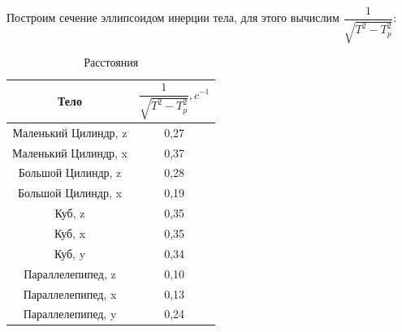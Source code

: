 Построим сечение эллипсоидом инерции тела, для этого вычислим $ \dfrac{1}{\sqrt{T^2 - T_p^2}} $:
\begin{table}[!ht]
   \centering
   \caption{Расстояния}
   \begin{tabular}{|c|c|}
   \hline
      Тело & $ \dfrac{1}{\sqrt{T^2 - T_p^2}}, c^{-1} $ \\ \hline
       Маленький Цилиндр,  z & 0,27 \\ \hline
       Маленький Цилиндр,  x & 0,37 \\ \hline
       Большой Цилиндр, z & 0,28 \\ \hline
       Большой Цилиндр, x & 0,19 \\ \hline
       Куб, z & 0,35 \\ \hline
       Куб, x & 0,35 \\ \hline
       Куб, y & 0,34 \\ \hline
       Параллелепипед, z & 0,10 \\ \hline
       Параллелепипед, x & 0,13 \\ \hline
       Параллелепипед, y & 0,24 \\ \hline
   \end{tabular}
\end{table}
